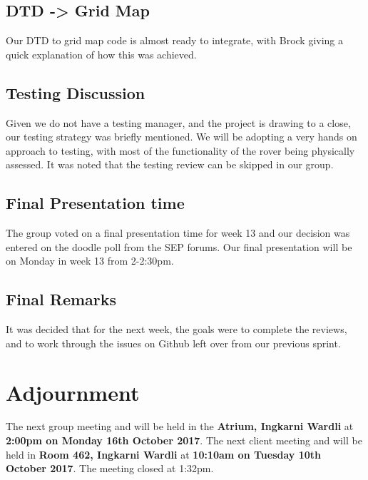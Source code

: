 \documentclass{article}
\begin{document}
    \subsection{DTD -> Grid Map}
Our DTD to grid map code is almost ready to integrate, with Brock giving a quick explanation of how this was achieved.
    \subsection{Testing Discussion}
Given we do not have a testing manager, and the project is drawing to a close, our testing strategy was briefly mentioned. We will be adopting a very hands on approach to testing, with most of the functionality of the rover being physically assessed. It was noted that the testing review can be skipped in our group.
    \subsection{Final Presentation time}
The group voted on a final presentation time for week 13 and our decision was entered on the doodle poll from the SEP forums. Our final presentation will be on Monday in week 13 from 2-2:30pm.

\subsection{Final Remarks}
It was decided that for the next week, the goals were to complete the reviews, and to work through the issues on Github left over from our previous sprint.
     
\section{Adjournment}
	The next group meeting and will be held in the {\bf Atrium, Ingkarni Wardli} at {\bf 2:00pm on Monday 16th October 2017}.\newline
    The next client meeting and will be held in {\bf Room 462, Ingkarni Wardli} at {\bf 10:10am on Tuesday 10th October 2017}.\newline
The meeting closed at 1:32pm.
\end{document}
